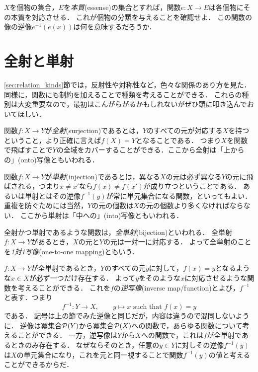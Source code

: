 \documentclass[11pt,a4paper]{jsarticle} %
\begin{document}
\begin{example}
\label{eg:essence}
$X$を個物の集合，$E$を\emph{本質}(essense)の集合とすれば，関数$e:X \to E$は各個物にその本質を対応させる．
これが個物の分類を与えることを確認せよ．
この関数の像の逆像$e^{-1} (e(x))$は何を意味するだろうか．
\end{example}


\section{全射と単射}
\ref{sec:relation_kinds}節では，反射性や対称性など，色々な関係のあり方を見た．
同様に，関数にも制約を加えることで種類を考えることができる．
これらの種別は大変重要なので，最初はこんがらがるかもしれないがぜひ頭に叩き込んでおいてほしい．

関数$f:X \to Y$が\emph{全射}(surjection)であるとは，$Y$のすべての元が対応する$X$を持つということ，より正確に言えば$f(X)=Y$となることである．
つまり$X$を関数で飛ばすことで$Y$の全域をカバーすることができる．ここから全射は「上からの」(onto)写像ともいわれる．

関数$f:X \to Y$が\emph{単射}(injection)であるとは，異なる$X$の元は必ず異なる$Y$の元に飛ばされる，つまり$x \neq x'$なら$f(x) \neq f(x')$が成り立つということである．
あるいは単射とはその逆像$f^{-1}(y)$が常に単元集合になる関数，といってもよい．
重複を防ぐためには当然，$Y$の元の個数は$X$の元の個数より多くなければならない．
ここから単射は「中への」(into)写像ともいわれる．

全射かつ単射であるような関数は，\emph{全単射}(bijection)といわれる．
全単射$f:X \to Y$があるとき，$X$の元と$Y$の元は一対一に対応する．
よって全単射のことを\emph{1対1写像}(one-to-one mapping)ともいう．

$f:X \to Y$が全単射であるとき，$Y$のすべての元$y$に対して，$f(x)=y$となるような$x \in X$が必ず一つだけ存在する．
よって$y$をそのような$x$に対応させるような関数を考えることができる．
これを$f$の\emph{逆写像}(inverse map/function)とよび，$f^{-1}$と表す．つまり
\[
 f^{-1}:Y \to X, \hspace{2em} y \mapsto x \text{ such that } f(x)=y
\]
である．
記号は上の節でみた逆像と同じだが，内容は違うので混同しないように．
逆像は冪集合$\mathcal{P}(Y)$から冪集合$\mathcal{P}(X)$への関数で，あらゆる関数について考えることができる．
一方，逆写像は$Y$から$X$への関数で，これは$f$が全単射であるときのみ存在する．
なぜならそのとき，任意の$y \in Y$に対しその逆像$f^{-1}(y)$は$X$の単元集合になり，これを元と同一視することで関数$f^{-1}(y)$の値と考えることができるからだ．
\end{document}
